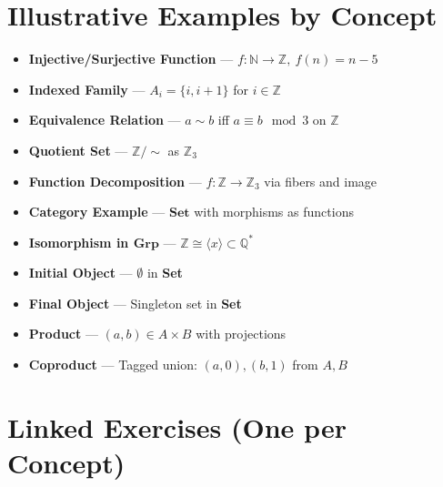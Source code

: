 \documentclass[10pt]{article}
\theoremstyle{plain}
\theoremstyle{definition}
\begin{document}
  \section*{Illustrative Examples by Concept}
  
  \begin{itemize}
  	\item \textbf{Injective/Surjective Function} — $f: \mathbb{N} \to \mathbb{Z},\ f(n) = n - 5$
  	\item \textbf{Indexed Family} — $A_i = \{i, i+1\}$ for $i \in \mathbb{Z}$
  	\item \textbf{Equivalence Relation} — $a \sim b$ iff $a \equiv b \mod 3$ on $\mathbb{Z}$
  	\item \textbf{Quotient Set} — $\mathbb{Z}/\sim$ as $\mathbb{Z}_3$
  	\item \textbf{Function Decomposition} — $f: \mathbb{Z} \to \mathbb{Z}_3$ via fibers and image
  	\item \textbf{Category Example} — $\textbf{Set}$ with morphisms as functions
  	\item \textbf{Isomorphism in $\textbf{Grp}$} — $\mathbb{Z} \cong \langle x \rangle \subset \mathbb{Q}^*$
  	\item \textbf{Initial Object} — $\emptyset$ in \textbf{Set}
  	\item \textbf{Final Object} — Singleton set in \textbf{Set}
  	\item \textbf{Product} — $(a, b) \in A \times B$ with projections
  	\item \textbf{Coproduct} — Tagged union: $(a, 0), (b, 1)$ from $A, B$
  \end{itemize}
  
  \section*{Linked Exercises (One per Concept)}
  
\end{document}

